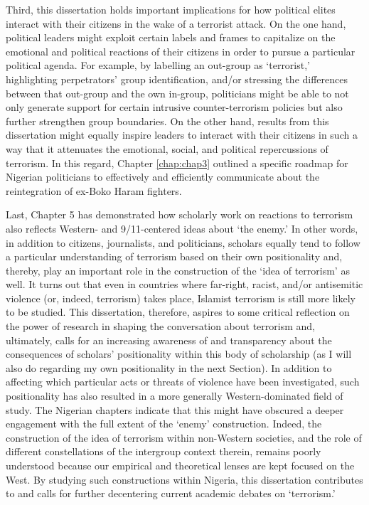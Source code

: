 Third, this dissertation holds important implications for how political elites interact with their citizens in the wake of a terrorist attack. On the one hand, political leaders might exploit certain labels and frames to capitalize on the emotional and political reactions of their citizens in order to pursue a particular political agenda. For example, by labelling an out-group as `terrorist,' highlighting perpetrators' group identification, and/or stressing the differences between that out-group and the own in-group, politicians might be able to not only generate support for certain intrusive counter-terrorism policies but also further strengthen group boundaries. On the other hand, results from this dissertation might equally inspire leaders to interact with their citizens in such a way that it attenuates the emotional, social, and political repercussions of terrorism. In this regard, Chapter \ref{chap:chap3} outlined a specific roadmap for Nigerian politicians to effectively and efficiently communicate about the reintegration of ex-Boko Haram fighters.


Last, Chapter 5 has demonstrated how scholarly work on reactions to terrorism also reflects Western- and 9/11-centered ideas about `the enemy.' In other words, in addition to citizens, journalists, and politicians, scholars equally tend to follow a particular understanding of terrorism based on their own positionality and, thereby, play an important role in the construction of the `idea of terrorism' as well. It turns out that even in countries where far-right, racist, and/or antisemitic violence (or, indeed, terrorism) takes place, Islamist terrorism is still more likely to be studied. This dissertation, therefore, aspires to some critical reflection on the power of research in shaping the conversation about terrorism and, ultimately, calls for an increasing awareness of and transparency about the consequences of scholars' positionality within this body of scholarship (as I will also do regarding my own positionality in the next Section). In addition to affecting which particular acts or threats of violence have been investigated, such positionality has also resulted in a more generally Western-dominated field of study. The Nigerian chapters indicate that this might have obscured a deeper engagement with the full extent of the `enemy' construction. Indeed, the construction of the idea of terrorism within non-Western societies, and the role of different constellations of the intergroup context therein, remains poorly understood because our empirical and theoretical lenses are kept focused on the West. By studying such constructions within Nigeria, this dissertation contributes to and calls for further decentering current academic debates on `terrorism.' 


